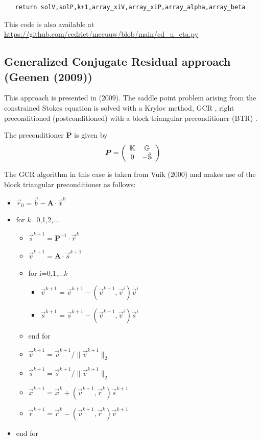 \begin{lstlisting}
   return solV,solP,k+1,array_xiV,array_xiP,array_alpha,array_beta
\end{lstlisting}

This code is also available at \url{https://github.com/cedrict/meeuuw/blob/main/cd_u_eta.py}









\newpage
\subsection{Generalized Conjugate Residual approach (Geenen \etal (2009))}

This approach is presented in \textcite{geum09} (2009).  
The saddle point problem arising from the constrained Stokes equation is 
solved with a Krylov method, GCR \cite{vavu94}, right preconditioned (postconditioned) 
with a block triangular preconditioner (BTR) \cite{brpa88}.

The preconditioner ${\bm P}$ is given by
\[
{\bm P} = \left(
\begin{array}{cc}
{\mathbb{K}} & {\mathbb{G}} \\
0 & - \tilde{{\mathbb{S}}}
\end{array}
\right)
\]

The GCR algorithm \cite{eies83} in this case is taken from Vuik \etal (2000) \cite{vusb00}
and makes use of the block triangular preconditioner as follows:
\begin{itemize}
\item[] $\vec{r}_0 = \vec{b} - {\bm A}\cdot \vec{x}^0$
\item[] for $k$=0,1,2,...
\begin{itemize}
\item $\vec{s}^{k+1}={\bm P}^{-1} \cdot \vec{r}^k$
\item $\vec{v}^{k+1} = {\bm A}\cdot \vec{s}^{k+1}$
\item for i=0,1,...$k$
\begin{itemize}
\item $\vec{v}^{k+1}=\vec{v}^{k+1} - (\vec{v}^{k+1},\vec{v}^{i}) \vec{v}^i$
\item $\vec{s}^{k+1}=\vec{s}^{k+1} - (\vec{v}^{k+1},\vec{v}^{i}) \vec{s}^i$
\end{itemize}
\item end for
\item $\vec{v}^{k+1}=\vec{v}^{k+1} / \| \vec{v}^{k+1} \|_2$
\item $\vec{s}^{k+1}=\vec{s}^{k+1} / \| \vec{v}^{k+1} \|_2$  
\item $\vec{x}^{k+1} = \vec{x}^k + (\vec{v}^{k+1},\vec{r}^k) \vec{s}^{k+1} $
\item $\vec{r}^{k+1} = \vec{r}^k - (\vec{v}^{k+1}, \vec{r}^k) \vec{v}^{k+1}$
\end{itemize}
\item[] end for
\end{itemize}

